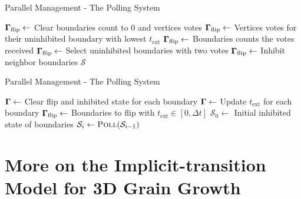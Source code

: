 \documentclass[usenames,dvipsnames]{beamer}
\begin{document}
\begin{frame}{Parallel Management - The Polling System}
    \begin{algorithmic}[1]
\State $\bm{\Gamma}_{\text{flip}} \gets$ Clear boundaries count to 0 and vertices votes
\State $\bm{\Gamma}_{\text{flip}} \gets$ Vertices votes for their uninhibited boundary with lowest $t_{\text{ext}}$
\State $\bm{\Gamma}_{\text{flip}} \gets$ Boundaries counts the votes received
\State $\bm{\Gamma}_{\text{flip}} \gets$ Select uninhibited boundaries with two votes
\State $\bm{\Gamma}_{\text{flip}} \gets$ Inhibit neighbor boundaries
\State \Return $\mathcal{S}$ 
\EndProcedure
\end{algorithmic}
\end{frame}

\begin{frame}{Parallel Management - The Polling System}
    \begin{algorithmic}[1]
\State $\bm{\Gamma} \gets$ Clear flip and inhibited state for each boundary
\State $\bm{\Gamma} \gets$ Update $t_{\text{ext}}$ for each boundary
\State $\bm{\Gamma}_{\text{flip}} \gets$ Boundaries to flip with $t_{\text{ext}} \in [0, \Delta t]$
\State $\mathcal{S}_0 \gets$ Initial inhibited state of boundaries
    \State $\mathcal{S}_i \gets \textsc{Poll}(\mathcal{S}_{i-1})$
    \State \Return
    \EndIf
\EndFor
\EndProcedure
\end{algorithmic}
\end{frame}

\section[3D Implicit-transition Model]{More on the Implicit-transition Model for 3D Grain Growth}
\end{document}
